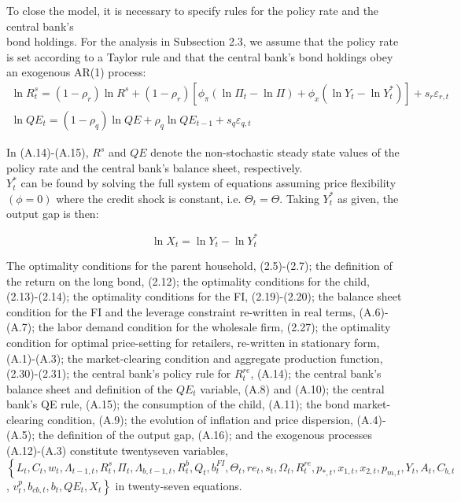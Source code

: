 \documentclass[10pt]{article}
\begin{document}
To close the model, it is necessary to specify rules for the policy rate and the central bank's\\
bond holdings. For the analysis in Subsection 2.3, we assume that the policy rate is set according to a Taylor rule and that the central bank's bond holdings obey an exogenous AR(1) process:\\
\begin{gather*}
\ln R_{t}^{s}=\left(1-\rho_{r}\right) \ln R^{s}+\left(1-\rho_{r}\right)\left[\phi_{\pi}\left(\ln \Pi_{t}-\ln \Pi\right)+\phi_{x}\left(\ln Y_{t}-\ln Y_{t}^{*}\right)\right]+s_{r} \varepsilon_{r, t}  \tag{A.14}\\
\ln Q E_{t}=\left(1-\rho_{q}\right) \ln Q E+\rho_{q} \ln Q E_{t-1}+s_{q} \varepsilon_{q, t} \tag{A.15}
\end{gather*}

In (A.14)-(A.15), $R^{s}$ and $Q E$ denote the non-stochastic steady state values of the policy rate and the central bank's balance sheet, respectively.\\
$Y_{t}^{*}$ can be found by solving the full system of equations assuming price flexibility $(\phi=0)$ where the credit shock is constant, i.e. $\Theta_{t}=\Theta$. Taking $Y_{t}^{*}$ as given, the output gap is then:

\begin{equation*}
\ln X_{t}=\ln Y_{t}-\ln Y_{t}^{*} \tag{A.16}
\end{equation*}

The optimality conditions for the parent household, (2.5)-(2.7); the definition of the return on the long bond, (2.12); the optimality conditions for the child, (2.13)-(2.14); the optimality conditions for the FI, (2.19)-(2.20); the balance sheet condition for the FI and the leverage constraint re-written in real terms, (A.6)-(A.7); the labor demand condition for the wholesale firm, (2.27); the optimality condition for optimal price-setting for retailers, re-written in stationary form, (A.1)-(A.3); the market-clearing condition and aggregate production function, (2.30)-(2.31); the central bank's policy rule for $R_{t}^{r e}$, (A.14); the central bank's balance sheet and definition of the $Q E_{t}$ variable, (A.8) and (A.10); the central bank's QE rule, (A.15); the consumption of the child, (A.11); the bond market-clearing condition, (A.9); the evolution of inflation and price dispersion, (A.4)-(A.5); the definition of the output gap, (A.16); and the exogenous processes (A.12)-(A.3) constitute twentyseven variables, $\left\{L_{t}, C_{t}, w_{t}, \Lambda_{t-1, t}, R_{t}^{s}, \Pi_{t}, \Lambda_{b, t-1, t}, R_{t}^{b}, Q_{t}, b_{t}^{F I}, \Theta_{t}, r e_{t}, s_{t}, \Omega_{t}, R_{t}^{r e}, p_{*, t}, x_{1, t}, x_{2, t}, p_{m, t}, Y_{t}, A_{t}, C_{b, t}\right.$, $\left.v_{t}^{p}, b_{c b, t}, b_{t}, Q E_{t}, X_{t}\right\}$ in twenty-seven equations.
\end{document}
